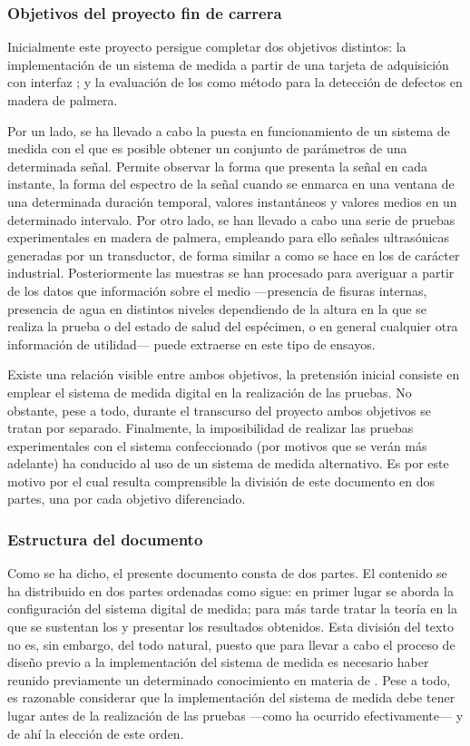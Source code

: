 \subsubsection{Objetivos del proyecto fin de carrera}\label{sec:goals}

Inicialmente este proyecto persigue completar dos objetivos distintos: la
implementación de un sistema de medida a partir de una tarjeta de
adquisición con interfaz ; y la evaluación de los  como
método para la detección de defectos en madera de palmera.

Por un lado, se ha llevado a cabo la puesta en funcionamiento de un sistema
de medida con el que es posible obtener un conjunto de parámetros de una
determinada señal. Permite observar la forma que presenta la señal en cada
instante, la forma del espectro de la señal cuando se enmarca en una
ventana de una determinada duración temporal, valores instantáneos y
valores medios en un determinado intervalo. Por otro lado, se han llevado a
cabo una serie de pruebas experimentales en madera de palmera, empleando
para ello señales ultrasónicas generadas por un transductor, de forma
similar a como se hace en los  de carácter industrial.
Posteriormente las muestras se han procesado para averiguar a partir de los
datos que información sobre el medio ---presencia de fisuras internas,
presencia de agua en distintos niveles dependiendo de la altura en la que
se realiza la prueba o del estado de salud del espécimen, o en general
cualquier otra información de utilidad--- puede extraerse en este tipo de
ensayos.

Existe una relación visible entre ambos objetivos, la pretensión inicial
consiste en emplear el sistema de medida digital en la realización de las
pruebas. No obstante, pese a todo, durante el transcurso del proyecto ambos
objetivos se tratan por separado. Finalmente, la imposibilidad de realizar
las pruebas experimentales con el sistema confeccionado (por motivos que se
verán más adelante) ha conducido al uso de un sistema de medida
alternativo. Es por este motivo por el cual resulta comprensible la
división de este documento en dos partes, una por cada objetivo
diferenciado.


\subsubsection{Estructura del documento}

Como se ha dicho, el presente documento consta de dos partes. El contenido
se ha distribuido en dos partes ordenadas como sigue: en primer lugar se
aborda la configuración del sistema digital de medida; para más tarde
tratar la teoría en la que se sustentan los  y presentar los
resultados obtenidos. Esta división del texto no es, sin embargo, del todo
natural, puesto que para llevar a cabo el proceso de diseño previo a la
implementación del sistema de medida es necesario haber reunido previamente
un determinado conocimiento en materia de . Pese a todo, es
razonable considerar que la implementación del sistema de medida debe tener
lugar antes de la realización de las pruebas ---como ha ocurrido
efectivamente--- y de ahí la elección de este orden.

